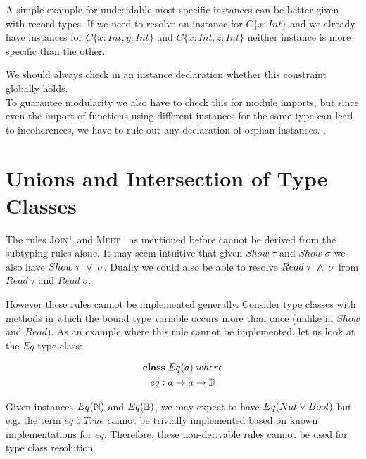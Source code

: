   A simple example for undecidable most specific instances can be better given with record types.
  If we need to resolve an instance for $C \{x : Int\}$ and we already have instances for $C \{x : Int, y : Int\}$ and $C \{x : Int, z : Int\}$ neither instance is more specific than the other.


  We should always check in an instance declaration whether this constraint globally holds. \\
  To guarantee modularity we also have to check this for module imports, but since even the import of functions using different instances for the same type can lead to incoherences, we have to rule out any declaration of orphan instances.
  \cite{Kilpatrick2019-cy}.

\section{Unions and Intersection of Type Classes}

The rules \textsc{Join}$^+$ and \textsc{Meet}$^-$ as mentioned before cannot be derived from the subtyping rules alone.
It may seem intuitive that given $Show \; \tau$ and $Show \; \sigma$ we also have $Show \; \tau \; \vee \; \sigma$.
Dually we could also be able to resolve $Read \; \tau \; \wedge \; \sigma$ from $Read \; \tau$ and $Read \; \sigma$.

However these rules cannot be implemented generally.
Consider type classes with methods in which the bound type variable occurs more than once (unlike in $Show$ and $Read$).
As an example where this rule cannot be implemented, let us look at the $Eq$ type class:

\begin{gather}
\nonumber {\bf class} \; Eq(a) \; where\\
\nonumber  eq : a \to a \to \mathbb{B}
\end{gather}

Given instances $Eq(\mathbb{N})$ and $Eq(\mathbb{B})$, we may expect to have $Eq(Nat \vee Bool)$ but e.g. the term $eq \; 5 \; True$ cannot be trivially implemented based on known implementations for $eq$.
Therefore, these non-derivable rules cannot be used for type class resolution.




